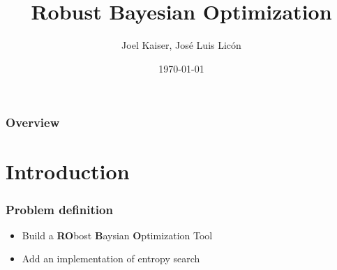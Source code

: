 \documentclass[10pt,handout]{beamer}
\title[RoBO]
{Robust Bayesian Optimization}
\author{Joel Kaiser, José Luis Licón}
\institute[Uni Freiburg] %
{
Albert-Ludwigs-Universität Freiburg \\ %
\medskip
}
\date{\today} %
\begin{document}



\begin{frame}
\titlepage %
\end{frame}

\begin{frame}
\frametitle{Overview} %
\tableofcontents %
\end{frame}


\section{Introduction}

\begin{frame}
\frametitle{Problem definition}
\begin{itemize}
\item Build a \textbf{RO}bost \textbf{B}aysian \textbf{O}ptimization Tool
\item Add an implementation of entropy search
\end{itemize}
\end{frame}




\end{document}
